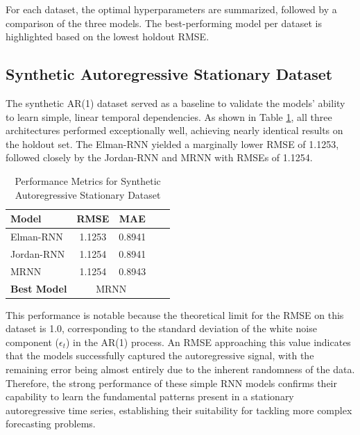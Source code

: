 \documentclass[conference, 10pt]{IEEEtran}
\begin{document}
For each dataset, the optimal hyperparameters are summarized, followed by a comparison of the three models. The
best-performing model per dataset is highlighted based on the lowest holdout RMSE.

\subsection{Synthetic Autoregressive Stationary Dataset}

The synthetic AR(1) dataset served as a baseline to validate the models' ability to learn simple, linear temporal
dependencies. As shown in Table \ref{tab:results_ar1}, all three architectures performed exceptionally well, achieving
nearly identical results on the holdout set. The Elman-RNN yielded a marginally lower RMSE of 1.1253, followed closely
by the Jordan-RNN and MRNN with RMSEs of 1.1254.

\begin{table}[H]
    \centering
    \begin{tabular}{|l|c|c|c|c|}
        \hline
        \textbf{Model}& \textbf{RMSE} & \textbf{MAE} \\ 
        \hline
        Elman-RNN & 1.1253 & 0.8941 \\
        \hline
        Jordan-RNN & 1.1254 & 0.8941 \\
        \hline
        MRNN & 1.1254 & 0.8943 \\
        \hline
        \textbf{Best Model} &\multicolumn{2}{c|}{{MRNN}} \\ 
        \hline
    \end{tabular}
    \vspace{4pt}
    \caption{Performance Metrics for Synthetic Autoregressive Stationary Dataset}
    \label{tab:results_ar1}
\end{table}

This performance is notable because the theoretical limit for the RMSE on this dataset is 1.0, corresponding to the
standard deviation of the white noise component ($\epsilon_t$) in the AR(1) process. An RMSE approaching this value
indicates that the models successfully captured the autoregressive signal, with the remaining error being almost
entirely due to the inherent randomness of the data. Therefore, the strong performance of these simple RNN
models confirms their capability to learn the fundamental patterns present in a stationary autoregressive time series,
establishing their suitability for tackling more complex forecasting problems.
\end{document}
